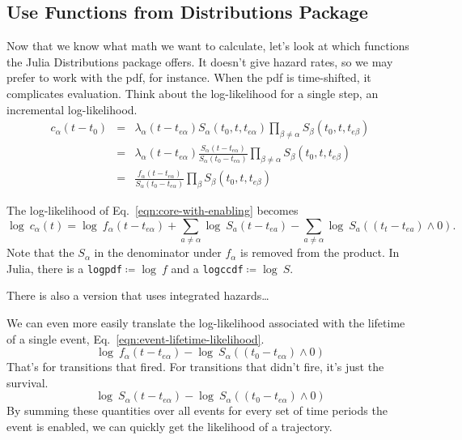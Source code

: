 \documentclass{article}
\begin{document}
\subsection{Use Functions from Distributions Package}
Now that we know what math we want to calculate, let's look at which functions the Julia Distributions package offers. It doesn't give hazard rates, so we may prefer to work with the pdf, for instance. When the pdf is time-shifted, it complicates evaluation. Think about the log-likelihood for a single step, an incremental log-likelihood.
\begin{eqnarray}
	c_\alpha(t-t_0) &=& \lambda_\alpha(t-t_{e\alpha})S_\alpha(t_0,t,t_{e\alpha})\prod_{\beta\ne\alpha} S_\beta(t_0,t,t_{e\beta}) \\
	&=&
	\lambda_\alpha(t-t_{e\alpha})\frac{S_\alpha(t-t_{e\alpha})}{S_\alpha(t_0-t_{e\alpha})}\prod_{\beta\ne\alpha} S_\beta(t_0,t,t_{e\beta}) \\
	&=&
	\frac{f_\alpha(t-t_{e\alpha})}{S_\alpha(t_0-t_{e\alpha})}\prod_{\beta} S_\beta(t_0,t,t_{e\beta})
\end{eqnarray}

The log-likelihood of Eq.~\ref{eqn:core-with-enabling} becomes
\begin{equation}
  \log\:c_{\alpha}(t) = \log\:f_\alpha(t-t_{e\alpha})+\sum_{a\ne\alpha} \log\:S_a(t-t_{ea}) - \sum_{a\ne\alpha} \log\:S_a((t_t-t_{ea})\wedge 0).
\end{equation}
Note that the $S_\alpha$ in the denominator under $f_\alpha$ is removed from the product.
In Julia, there is a \texttt{logpdf}$\coloneqq\log\:f$ and a \texttt{logccdf}$\coloneqq\log\:S$.

There is also a version that uses integrated hazards\ldots

We can even more easily translate the log-likelihood associated with the lifetime of a single event, Eq.~\ref{eqn:event-lifetime-likelihood}.
\begin{equation}
	\log\:f_\alpha(t-t_{e\alpha}) - \log\:S_\alpha((t_0-t_{e\alpha})\wedge 0)
\end{equation}
That's for transitions that fired. For transitions that didn't fire, it's just the survival.
\begin{equation}
	\log\:S_\alpha(t-t_{e\alpha}) - \log\:S_\alpha((t_0-t_{e\alpha})\wedge 0)
\end{equation}
By summing these quantities over all events for every set of time periods the event is enabled, we can quickly get the likelihood of a trajectory.
\end{document}
